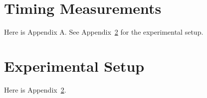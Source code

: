 \documentclass[dissertation]{bsu-cs}  %
\begin{document}

\appendix


\chapter{Timing Measurements}\label{app:Timing}

Here is Appendix A. See Appendix~\ref{app:Setup} for the experimental setup.


\chapter{Experimental Setup}\label{app:Setup}

Here is Appendix~\ref{app:Setup}.


\finish  %
\end{document}

